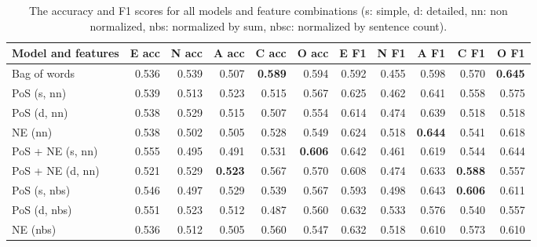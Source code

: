 \documentclass[10pt, a4paper]{article}
\begin{document}
\begin{table}
  \caption{The accuracy and F1 scores for all models and feature combinations (s: simple, d: detailed, nn: non normalized, nbs: normalized by sum, nbsc: normalized by sentence count).}
  \begin{center}
  \begin{tabular}{lrrrrrrrrrr}
    \toprule
    Model and features  &  E acc         & N acc          & A acc          & C acc          &  O acc         & E F1           & N F1           & A F1           & C F1           & O F1\\
    \midrule
          Bag of words & 0.536          & 0.539          & 0.507          & \textbf{0.589} & 0.594          & 0.592          & 0.455          & 0.598          & 0.570          &  \textbf{0.645}\\
           PoS (s, nn) & 0.539          & 0.513          & 0.523          & 0.515          & 0.567          & 0.625          & 0.462          & 0.641          & 0.558          &  0.575\\
           PoS (d, nn) & 0.538          & 0.529          & 0.515          & 0.507          & 0.554          & 0.614          & 0.474          & 0.639          & 0.518          &  0.518\\
               NE (nn) & 0.538          & 0.502          & 0.505          & 0.528          & 0.549          & 0.624          & 0.518          & \textbf{0.644} & 0.541          &  0.618\\
      PoS + NE (s, nn) & 0.555          & 0.495          & 0.491          & 0.531          & \textbf{0.606} & 0.642          & 0.461          & 0.619          & 0.544          &  0.644\\
      PoS + NE (d, nn) & 0.521          & 0.529          & \textbf{0.523} & 0.567          & 0.570          & 0.608          & 0.474          & 0.633          & \textbf{0.588} &  0.557\\
          PoS (s, nbs) & 0.546          & 0.497          & 0.529          & 0.539          & 0.567          & 0.593          & 0.498          & 0.643          & \textbf{0.606} &  0.611\\
          PoS (d, nbs) & 0.551          & 0.523          & 0.512          & 0.487          & 0.560          & 0.632          & 0.533          & 0.576          & 0.540          &  0.557\\
              NE (nbs) & 0.536          & 0.512          & 0.505          & 0.560          & 0.547          & 0.632          & 0.518          & 0.610          & 0.573          &  0.610\\

\end{tabular}
\end{center}
\end{table}
\end{document}
